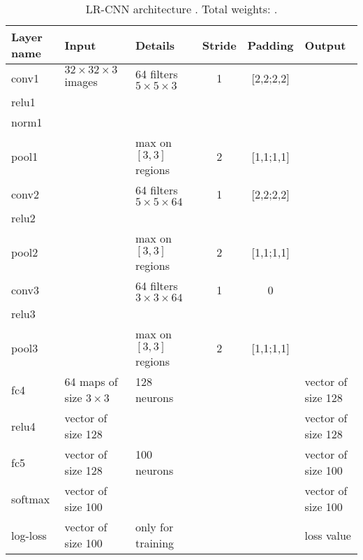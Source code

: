 \begin{table}[h]
\begin{center}
 \begin{tabular}{|l||l||l|c|c||l|}
   \hline
   Layer name & Input                          & Details                                 & Stride & Padding   & Output                 \\
   \hline
   \hline
   conv1      & $32 \times 32 \times 3$ images & 64 filters $5 \times 5 \times 3$        & 1      & [2,2;2,2] &  \\
   relu1      &                                &                                         &        &           &  \\
   norm1      &                                &                                         &        &           &  \\
   pool1      &                                & max on $[3,3]$ regions                  & 2      & [1,1;1,1] &  \\
   \hline
   conv2      &                                & 64 filters $5 \times 5 \times 64$       & 1      & [2,2;2,2] &  \\
   relu2      &                                &                                         &        &           &  \\
   pool2      &                                & max on $[3,3]$ regions                  & 2      & [1,1;1,1] &  \\
   \hline
   conv3      &                                & 64 filters $3 \times 3 \times 64$       & 1      & 0         &  \\
   relu3      &                                &                                         &        &           &  \\
   pool3      &                                & max on $[3,3]$ regions                  & 2      & [1,1;1,1] &  \\
   \hline
   fc4        & 64 maps of size $3 \times 3$   & 128 neurons                             &        &           & vector of size 128 \\
   relu4      & vector of size 128             &                                         &        &           & vector of size 128 \\
   \hline
   fc5        & vector of size 128             & 100 neurons                             &        &           & vector of size 100 \\
   softmax    & vector of size 100             &                                         &        &           & vector of size 100 \\
   log-loss   & vector of size 100             & only for training                       &        &           & loss value         \\
   \hline
 \end{tabular}
 \caption{LR-CNN architecture \cite{Chevalier15}. Total weights: .}
 \label{table:LR-CNN}
\end{center}
\end{table} 







